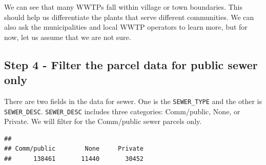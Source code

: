 \documentclass[
]{book}
\newenvironment{Shaded}{\begin{snugshade}}{\end{snugshade}}
\newcommand{\CommentTok}[1]{\textcolor[rgb]{0.56,0.35,0.01}{\textit{#1}}}
\newcommand{\FunctionTok}[1]{\textcolor[rgb]{0.13,0.29,0.53}{\textbf{#1}}}
\newcommand{\NormalTok}[1]{#1}
\newcommand{\SpecialCharTok}[1]{\textcolor[rgb]{0.81,0.36,0.00}{\textbf{#1}}}
\begin{document}
We can see that many WWTPs fall within village or town boundaries. This should help us differentiate the plants that serve different communities. We can also ask the municipalities and local WWTP operators to learn more, but for now, let us assume that we are not sure.

\subsection{Step 4 - Filter the parcel data for public sewer only}\label{step-4---filter-the-parcel-data-for-public-sewer-only}

There are two fields in the data for sewer. One is the \texttt{SEWER\_TYPE} and the other is \texttt{SEWER\_DESC}. \texttt{SEWER\_DESC} includes three categories: Comm/public, None, or Private. We will filter for the Comm/public sewer parcels only.

\begin{Shaded}
\end{Shaded}

\begin{verbatim}
## 
## Comm/public        None     Private 
##      138461       11440       30452
\end{verbatim}
\end{document}

